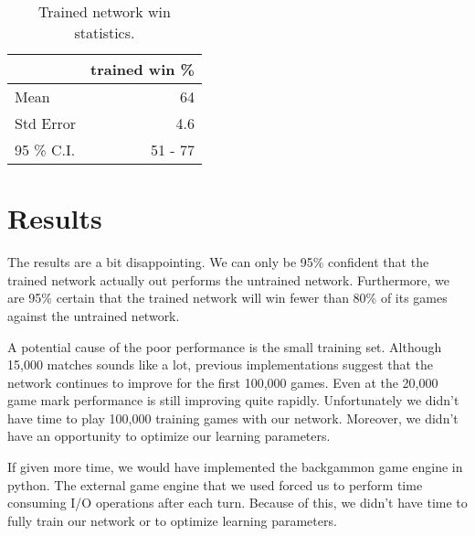 \documentclass{article}
\begin{document}
\begin{table}[!htb]
  \begin{center}
  \caption{Trained network win statistics.}
  \label{statsTable}
  \begin{tabular}{lr}
    \toprule
    {} &  trained win \% \\
    \midrule
    Mean &  64  \\
    Std Error & 4.6 \\
    95 \% C.I.& 51 - 77 \\
    \bottomrule
  \end{tabular}
  \end{center}
\end{table}


  \section*{Results}                                

  
  The results are a bit disappointing.  We can only be 95\% confident that the
  trained network actually out performs the untrained network.  Furthermore,
  we are 95\% certain that the trained network will win fewer than 80\% of its
  games against the untrained network.  

  A potential cause of the poor performance is the small training set.  Although
  15,000 matches sounds like a lot, previous implementations suggest that
  the network continues to improve for the first 100,000 games.  Even at the
  20,000 game mark performance is still improving quite rapidly.  Unfortunately
  we didn't have time to play 100,000 training games with our network.
  Moreover, we didn't have an opportunity to optimize our learning parameters.

  If given more time, we would have implemented the backgammon game engine
  in python.  The external game engine that we used forced us to perform time consuming I/O
  operations after each turn.  Because of this, we didn't have time to fully
  train our network or to optimize learning parameters.
  
\end{document}
